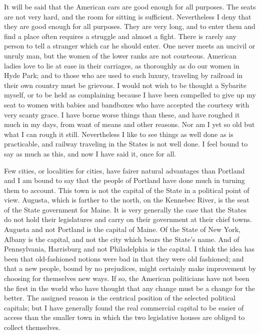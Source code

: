 It will be said that the American cars are good enough for all
purposes.  The seats are not very hard, and the room for sitting is
sufficient.  Nevertheless I deny that they are good enough for all
purposes.  They are very long, and to enter them and find a place
often requires a struggle and almost a fight.  There is rarely any
person to tell a stranger which car he should enter.  One never
meets an uncivil or unruly man, but the women of the lower ranks
are not courteous.  American ladies love to lie at ease in their
carriages, as thoroughly as do our women in Hyde Park; and to those
who are used to such luxury, traveling by railroad in their own
country must be grievous.  I would not wish to be thought a
Sybarite myself, or to be held as complaining because I have been
compelled to give up my seat to women with babies and bandboxes who
have accepted the courtesy with very scanty grace.  I have borne
worse things than these, and have roughed it much in my days, from
want of means and other reasons.  Nor am I yet so old but what I
can rough it still.  Nevertheless I like to see things as well done
as is practicable, and railway traveling in the States is not well
done.  I feel bound to say as much as this, and now I have said it,
once for all.

Few cities, or localities for cities, have fairer natural
advantages than Portland and I am bound to say that the people of
Portland have done much in turning them to account.  This town is
not the capital of the State in a political point of view.
Augusta, which is farther to the north, on the Kennebec River, is
the seat of the State government for Maine.  It is very generally
the case that the States do not hold their legislatures and carry
on their government at their chief towns.  Augusta and not Portland
is the capital of Maine.  Of the State of New York, Albany is the
capital, and not the city which bears the State's name.  And of
Pennsylvania, Harrisburg and not Philadelphia is the capital.  I
think the idea has been that old-fashioned notions were bad in that
they were old fashioned; and that a new people, bound by no
prejudices, might certainly make improvement by choosing for
themselves new ways.  If so, the American politicians have not been
the first in the world who have thought that any change must be a
change for the better.  The assigned reason is the centrical
position of the selected political capitals; but I have generally
found the real commercial capital to be easier of access than the
smaller town in which the two legislative houses are obliged to
collect themselves.

